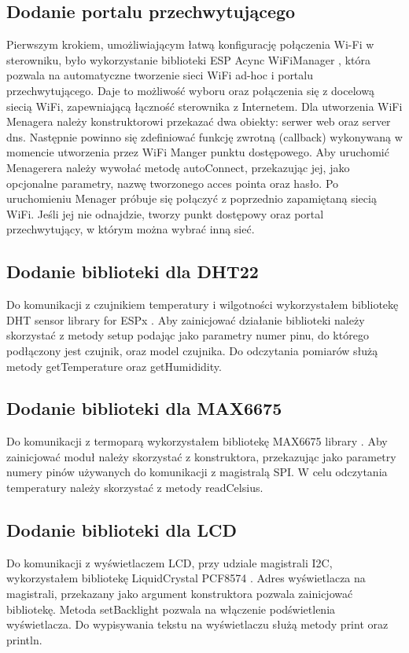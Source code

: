 \documentclass[11pt]{report}
\begin{document}
  \subsection{Dodanie portalu przechwytującego}
 Pierwszym krokiem, umożliwiającym łatwą konfigurację połączenia Wi-Fi w sterowniku, było wykorzystanie biblioteki ESP Acync WiFiManager \cite{WiFiManager}, która pozwala na automatyczne tworzenie sieci WiFi ad-hoc i portalu przechwytującego. Daje to możliwość wyboru oraz połączenia się z docelową siecią WiFi, zapewniającą łączność sterownika z Internetem.
 Dla utworzenia WiFi Menagera należy konstruktorowi przekazać dwa obiekty: serwer web oraz server dns. Następnie powinno się zdefiniować funkcję zwrotną (callback) wykonywaną w momencie utworzenia przez WiFi Manger punktu dostępowego. Aby uruchomić Menagerera należy wywołać metodę autoConnect, przekazując jej, jako opcjonalne parametry, nazwę tworzonego acces pointa oraz hasło. Po uruchomieniu Menager próbuje się połączyć z poprzednio zapamiętaną siecią WiFi. Jeśli jej nie odnajdzie, tworzy punkt dostępowy oraz portal przechwytujący, w którym można wybrać inną sieć.
 \subsection{Dodanie biblioteki dla DHT22}
 Do komunikacji z czujnikiem temperatury i wilgotności wykorzystałem bibliotekę DHT sensor library for ESPx \cite{DHTlibrary}. Aby zainicjować działanie biblioteki należy skorzystać z metody setup podając jako parametry numer pinu, do którego podłączony jest czujnik, oraz model czujnika. Do odczytania pomiarów służą metody getTemperature oraz getHumididity.
 \subsection{Dodanie biblioteki dla MAX6675}
 Do komunikacji z termoparą wykorzystałem bibliotekę MAX6675 library \cite{MAX6675library}. Aby zainicjować moduł należy skorzystać z konstruktora, przekazując jako parametry numery pinów używanych do komunikacji z magistralą SPI.
 W celu odczytania temperatury należy skorzystać z metody readCelsius.
 \subsection{Dodanie biblioteki dla LCD}
 Do komunikacji z wyświetlaczem LCD, przy udziale magistrali I2C, wykorzystałem bibliotekę LiquidCrystal PCF8574 \cite{LCDlibrary}. Adres wyświetlacza na magistrali, przekazany jako argument konstruktora pozwala zainicjować bibliotekę. Metoda setBacklight pozwala na włączenie podświetlenia wyświetlacza. Do wypisywania tekstu na wyświetlaczu służą metody print oraz println.
\end{document}
